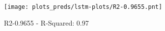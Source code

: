 
\begin{figure}[H]
    \centering
    \texttt{[image: plots\_preds/lstm-plots/R2-0.9655.pnt]}
    \caption{R2-0.9655 - R-Squared: 0.97}
\end{figure}
